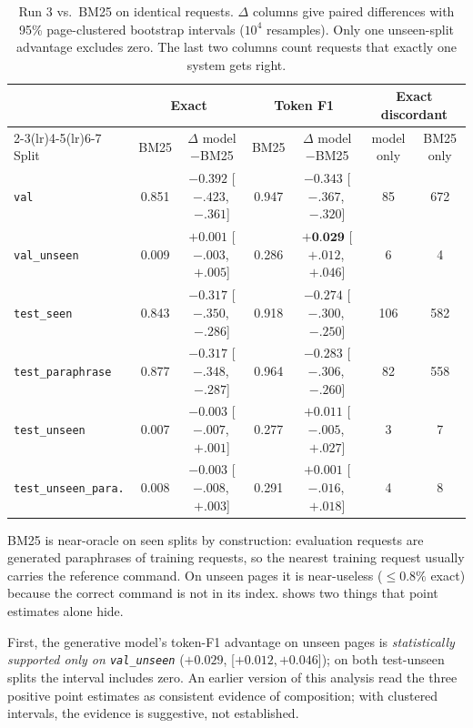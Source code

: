 \documentclass[11pt,a4paper]{article}
\newcommand{\best}[1]{\textbf{#1}}
\newcommand{\ci}[2]{{\scriptsize[#1,\,#2]}}
\begin{document}
\begin{table}[t]
\centering\footnotesize
\setlength{\tabcolsep}{3pt}
\begin{tabular}{lcccccc}
\toprule
 & \multicolumn{2}{c}{Exact} & \multicolumn{2}{c}{Token F1} & \multicolumn{2}{c}{Exact discordant} \\
\cmidrule(lr){2-3}\cmidrule(lr){4-5}\cmidrule(lr){6-7}
Split & BM25 & $\Delta$ model$-$BM25 & BM25 & $\Delta$ model$-$BM25 & model only & BM25 only \\
\midrule
\texttt{val} & 0.851 & $-0.392$ \ci{$-.423$}{$-.361$} & 0.947 & $-0.343$ \ci{$-.367$}{$-.320$} & 85 & 672 \\
\texttt{val\_unseen} & 0.009 & $+0.001$ \ci{$-.003$}{$+.005$} & 0.286 & $\best{+0.029}$ \ci{$+.012$}{$+.046$} & 6 & 4 \\
\texttt{test\_seen} & 0.843 & $-0.317$ \ci{$-.350$}{$-.286$} & 0.918 & $-0.274$ \ci{$-.300$}{$-.250$} & 106 & 582 \\
\texttt{test\_paraphrase} & 0.877 & $-0.317$ \ci{$-.348$}{$-.287$} & 0.964 & $-0.283$ \ci{$-.306$}{$-.260$} & 82 & 558 \\
\texttt{test\_unseen} & 0.007 & $-0.003$ \ci{$-.007$}{$+.001$} & 0.277 & $+0.011$ \ci{$-.005$}{$+.027$} & 3 & 7 \\
\texttt{test\_unseen\_para.} & 0.008 & $-0.003$ \ci{$-.008$}{$+.003$} & 0.291 & $+0.001$ \ci{$-.016$}{$+.018$} & 4 & 8 \\
\bottomrule
\end{tabular}
\caption{Run 3 vs.\ BM25 on identical requests. $\Delta$ columns give paired
differences with 95\% page-clustered bootstrap intervals ($10^4$
resamples). Only one unseen-split advantage excludes zero. The last two
columns count requests that exactly one system gets right.}
\label{tab:bm25}
\end{table}

BM25 is near-oracle on seen splits by construction: evaluation requests are
generated paraphrases of training requests, so the nearest training request
usually carries the reference command. On unseen pages it is near-useless
($\leq 0.8\%$ exact) because the correct command is not in its index.
 shows two things that point estimates alone hide.

First, the generative model's token-F1 advantage on unseen pages is
\emph{statistically supported only on \texttt{val\_unseen}}
($+0.029$, \ci{$+0.012$}{$+0.046$}); on both test-unseen splits the interval
includes zero. An earlier version of this analysis read the three positive
point estimates as consistent evidence of composition; with clustered
intervals, the evidence is suggestive, not established.
\end{document}
